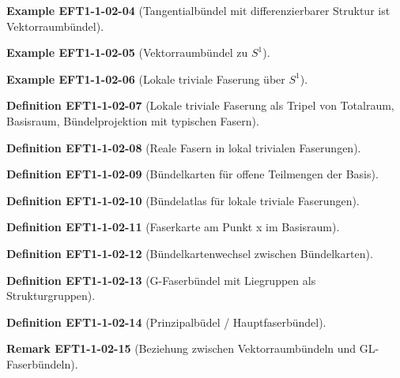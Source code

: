 \documentclass[10pt, letterpaper]{article}
\newcommand{\CustomHeading}[3]{%
  \par\medskip\noindent%
  \textbf{#1 #2} \textnormal{(#3)}.\enskip%
}
\newenvironment{DEF}[2]{\CustomHeading{Definition}{#1}{#2}}{}
\newenvironment{REM}[2]{\CustomHeading{Remark}{#1}{#2}}{}
\newenvironment{EXA}[2]{\CustomHeading{Example}{#1}{#2}}{}
\begin{document}
\begin{EXA}{EFT1-1-02-04}{Tangentialbündel mit differenzierbarer Struktur ist Vektorraumbündel}
\end{EXA}

\begin{EXA}{EFT1-1-02-05}{Vektorraumbündel zu $S^1$}
\end{EXA}

\begin{EXA}{EFT1-1-02-06}{Lokale triviale Faserung über $S^1$}
\end{EXA}

\begin{DEF}{EFT1-1-02-07}{Lokale triviale Faserung als Tripel von Totalraum, Basisraum, Bündelprojektion mit typischen Fasern}
\end{DEF}

\begin{DEF}{EFT1-1-02-08}{Reale Fasern in lokal trivialen Faserungen}
\end{DEF}

\begin{DEF}{EFT1-1-02-09}{Bündelkarten für offene Teilmengen der Basis}
\end{DEF}

\begin{DEF}{EFT1-1-02-10}{Bündelatlas für lokale triviale Faserungen}
\end{DEF}

\begin{DEF}{EFT1-1-02-11}{Faserkarte am Punkt x im Basisraum}
\end{DEF}

\begin{DEF}{EFT1-1-02-12}{Bündelkartenwechsel zwischen Bündelkarten}
\end{DEF}

\begin{DEF}{EFT1-1-02-13}{G-Faserbündel mit Liegruppen als Strukturgruppen}
\end{DEF}

\begin{DEF}{EFT1-1-02-14}{Prinzipalbüdel / Hauptfaserbündel}
\end{DEF}

\begin{REM}{EFT1-1-02-15}{Beziehung zwischen Vektorraumbündeln und GL-Faserbündeln}
\end{REM}
\end{document}
